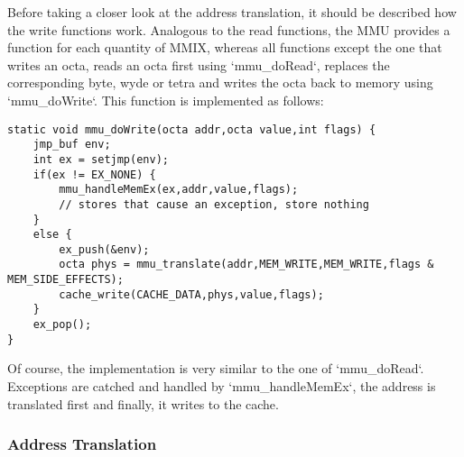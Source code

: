 Before taking a closer look at the address translation, it should be described how the write functions work. Analogous to the read functions, the MMU provides a function for each quantity of MMIX, whereas all functions except the one that writes an octa, reads an octa first using `mmu_doRead`, replaces the corresponding byte, wyde or tetra and writes the octa back to memory using `mmu_doWrite`. This function is implemented as follows:
\begin{lstlisting}[language=GIMMIXC,caption={Implementation of {\tt mmu\_doWrite}}]
static void mmu_doWrite(octa addr,octa value,int flags) {
	jmp_buf env;
	int ex = setjmp(env);
	if(ex != EX_NONE) {
		mmu_handleMemEx(ex,addr,value,flags);
		// stores that cause an exception, store nothing
	}
	else {
		ex_push(&env);
		octa phys = mmu_translate(addr,MEM_WRITE,MEM_WRITE,flags & MEM_SIDE_EFFECTS);
		cache_write(CACHE_DATA,phys,value,flags);
	}
	ex_pop();
}
\end{lstlisting}
Of course, the implementation is very similar to the one of `mmu_doRead`. Exceptions are catched and handled by `mmu_handleMemEx`, the address is translated first and finally, it writes to the cache.

\subsubsection{Address Translation}

